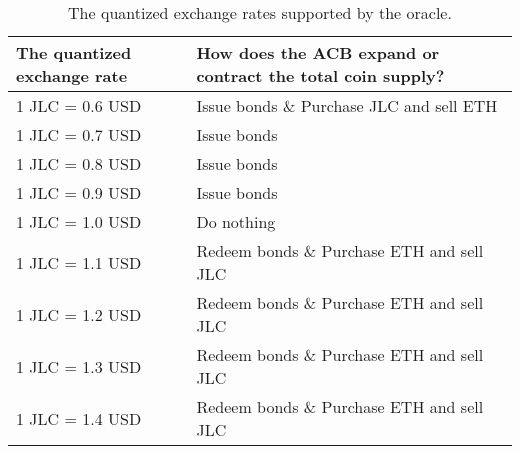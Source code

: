 \documentclass[dvipdfmx,a4paper]{article}
\begin{document}
\begin{table}[htb]
\begin{center}
\caption{The quantized exchange rates supported by the oracle.}\vspace{2ex}
\begin{tabular}{p{11em}|p{24em}}\hline
The quantized exchange rate & How does the ACB expand or contract the total coin supply?\\\hline
1 JLC = 0.6 USD & Issue bonds \& Purchase JLC and sell ETH\\
1 JLC = 0.7 USD & Issue bonds\\
1 JLC = 0.8 USD & Issue bonds\\
1 JLC = 0.9 USD & Issue bonds\\
1 JLC = 1.0 USD & Do nothing\\
1 JLC = 1.1 USD & Redeem bonds \& Purchase ETH and sell JLC\\
1 JLC = 1.2 USD & Redeem bonds \& Purchase ETH and sell JLC\\
1 JLC = 1.3 USD & Redeem bonds \& Purchase ETH and sell JLC\\
1 JLC = 1.4 USD & Redeem bonds \& Purchase ETH and sell JLC\\\hline
\end{tabular}
\label{table1}
\end{center}
\end{table}
\end{document}

